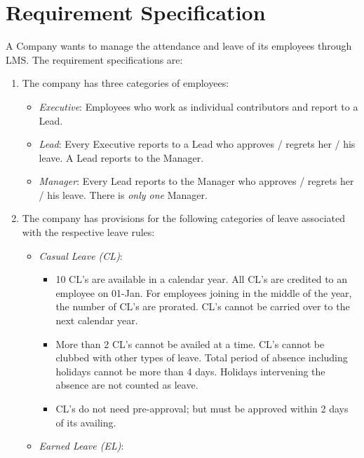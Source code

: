 \documentclass{article}
\begin{document}
\section*{Requirement Specification}
\begin{footnotesize}


A Company wants to manage the attendance and leave of its employees through LMS. The requirement specifications are:

\begin{enumerate}

\item The company has three categories of employees:

\begin{itemize}
\item {\em Executive}: Employees who work as individual contributors and report to a Lead.
\item {\em Lead}: Every Executive reports to a Lead who approves / regrets her / his leave. A Lead reports to the Manager.
\item {\em Manager}: Every Lead reports to the Manager who approves / regrets her / his leave.  There is {\em only one} Manager.
\end{itemize}

\item The company has provisions for the following categories of leave associated with the respective leave rules:

\begin{itemize}
\item {\em Casual Leave (CL)}: 
\begin{itemize}
\item 10 CL's are available in a calendar year. All CL's are credited to an employee on 01-Jan. For employees joining in the middle of the year, the number of CL's are prorated. CL's cannot be carried over to the next calendar year.

\item More than 2 CL's cannot be availed at a time. CL's cannot be clubbed with other types of leave. Total period of absence including holidays cannot be more than 4 days. Holidays intervening the absence are not counted as leave.

\item CL's do not need pre-approval; but must be approved within 2 days of its availing.

\end{itemize}
\item {\em Earned Leave (EL)}: 
\begin{itemize}


\end{itemize}
\end{itemize}
\end{enumerate}
\end{footnotesize}
\end{document}
